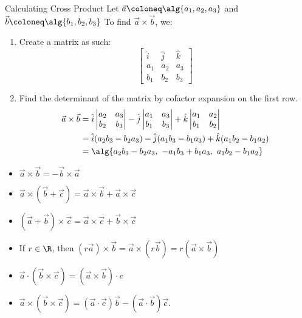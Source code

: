 \documentclass[math]{amznotes}
\begin{document}
\begin{tecbox}{Calculating Cross Product}{}
Let $\vec{a} \coloneq \alg{a_1, a_2, a_3}$ and $\vec{b} \coloneq \alg{b_1, b_2, b_3}$ To find $\vec{a} \times \vec{b}$, we:
\begin{enumerate}
    \item Create a matrix as such:
    \[ \begin{bmatrix}
        \hat{i} & \hat{j} & \hat{k} \\
        a_1 & a_2 & a_3 \\
        b_1 & b_2 & b_3
    \end{bmatrix} \]
    \item Find the determinant of the matrix by cofactor expansion on the first row.
    \begin{align*}
        \vec{a} \times \vec{b} &= \hat{i} \begin{vmatrix} a_2 & a_3 \\ b_2 & b_3 \end{vmatrix} - \hat{j} \begin{vmatrix} a_1 & a_3 \\ b_1 & b_3 \end{vmatrix} + \hat{k} \begin{vmatrix} a_1 & a_2 \\ b_1 & b_2 \end{vmatrix} \\
        &= \hat{i}(a_2b_3 - b_2a_3) - \hat{j}(a_1b_3 - b_1a_3) + \hat{k}(a_1b_2 - b_1a_2) \\
        &= \alg{ a_2b_3 - b_2a_3 ,\  -a_1b_3 + b_1a_3 ,\  a_1b_2 - b_1a_2 }
    \end{align*}
\end{enumerate}
\end{tecbox}

\begin{itemize}
    \item $\vec{a} \times \vec{b} = -\vec{b} \times \vec{a}$
    \item $\vec{a} \times (\vec{b} + \vec{c}) = \vec{a} \times \vec{b} + \vec{a} \times \vec{c}$
    \item $(\vec{a} + \vec{b}) \times \vec{c} = \vec{a} \times \vec{c} + \vec{b} \times \vec{c}$
    \item If $r \in \R$, then $(r\vec{a}) \times \vec{b} = \vec{a} \times (r\vec{b}) = r(\vec{a} \times \vec{b})$
    \item $\vec{a} \cdot (\vec{b} \times \vec{c}) = (\vec{a} \times \vec{b}) \cdot c$
    \item $\vec{a} \times (\vec{b} \times \vec{c}) = (\vec{a} \cdot \vec{c}) \vec{b} - (\vec{a} \cdot \vec{b}) \vec{c}$.
\end{itemize}
\end{document}
